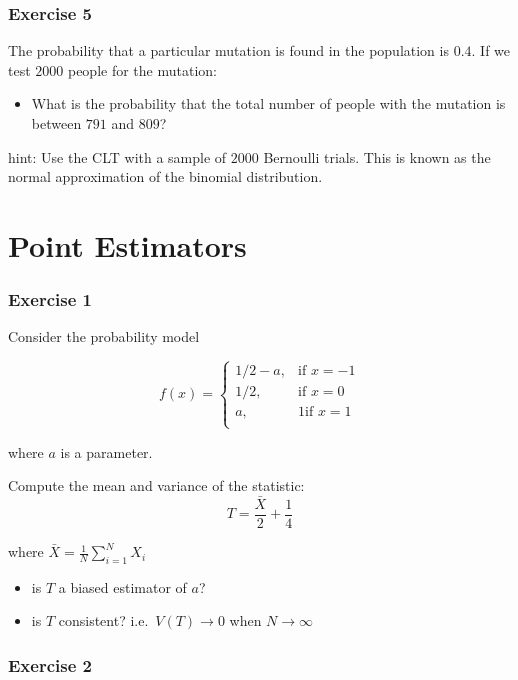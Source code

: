 \documentclass[
]{book}
\providecommand{\tightlist}{%
  \setlength{\itemsep}{0pt}\setlength{\parskip}{0pt}}
\begin{document}
\hypertarget{exercise-5-2}{%
\subsubsection{Exercise 5}\label{exercise-5-2}}

The probability that a particular mutation is found in the population is \(0.4\). If we test \(2000\) people for the mutation:

\begin{itemize}
\tightlist
\item
  What is the probability that the total number of people with the mutation is between \(791\) and \(809\)?
\end{itemize}

hint: Use the CLT with a sample of \(2000\) Bernoulli trials. This is known as the normal approximation of the binomial distribution.

\hypertarget{point-estimators-4}{%
\section{Point Estimators}\label{point-estimators-4}}

\hypertarget{exercise-1-6}{%
\subsubsection{Exercise 1}\label{exercise-1-6}}

Consider the probability model

\[
    f(x)= 
\begin{cases}
    1/2-a,& \text{if } x=-1 \\ 
    1/2,& \text{if } x=0\\
    a,& 1 \text{if } x=1\\ 
\end{cases}
\]

where \(a\) is a parameter.

Compute the mean and variance of the statistic: \[T=\frac{\bar{X}}{2}+\frac{1}{4}\]

where \(\bar{X}=\frac{1}{N}\sum_{i=1}^N X_i\)

\begin{itemize}
\item
  is \(T\) a biased estimator of \(a\)?
\item
  is \(T\) consistent? i.e.~\(V(T) \rightarrow 0\) when \(N\rightarrow \infty\)
\end{itemize}

\hypertarget{exercise-2-6}{%
\subsubsection{Exercise 2}\label{exercise-2-6}}
\end{document}
